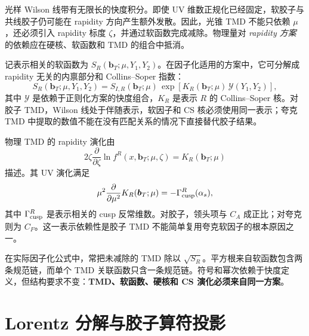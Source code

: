\documentclass[UTF8,12pt,a4paper,twoside,openany]{ctexbook}
\newcommand{\bT}{\boldsymbol b_T}
\begin{document}
光样 Wilson 线带有无限长的快度积分。即使 UV 维数正规化已经固定，软胶子与共线胶子仍可能在 rapidity 方向产生额外发散。因此，光锥 TMD 不能只依赖 \(\mu\)，还必须引入 rapidity 标度 \(\zeta\)，并通过软函数完成减除\cite{Collins2011,JiReview2021}。物理量对 \emph{rapidity 方案} 的依赖应在硬核、软函数和 TMD 的组合中抵消。

记表示相关的软函数为 \(S_R(\bT;\mu,Y_1,Y_2)\)。在因子化适用的方案中，它可分解成 rapidity 无关的内禀部分和 Collins--Soper 指数：
\begin{equation}
  S_R(\bT;\mu,Y_1,Y_2)
  =S_{I,R}(\bT;\mu)\,
  \exp\left[K_R(\bT;\mu)\,\mathcal Y(Y_1,Y_2)\right],
  \label{eq:softfactor}
\end{equation}
其中 \(\mathcal Y\) 是依赖于正则化方案的快度组合，\(K_R\) 是表示 \(R\) 的 Collins--Soper 核。对胶子 TMD，Wilson 线处于伴随表示，软因子和 CS 核必须使用同一表示；夸克 TMD 中提取的数值不能在没有匹配关系的情况下直接替代胶子结果。

物理 TMD 的 rapidity 演化由
\begin{equation}
  2\zeta\frac{\partial}{\partial\zeta}
  \ln f^{R}(x,\bT;\mu,\zeta)
  =K_R(\bT;\mu)
  \label{eq:CSequation}
\end{equation}
描述。其 UV 演化满足
\begin{equation}
  \mu^2\frac{\partial}{\partial\mu^2}K_R(\bT;\mu)
  =-\Gamma^{R}_{\rm cusp}(\alpha_s),
  \label{eq:csrge}
\end{equation}
其中 \(\Gamma^{R}_{\rm cusp}\) 是表示相关的 cusp 反常维数。对胶子，领头项与 \(C_A\) 成正比；对夸克则为 \(C_F\)。这一表示依赖性是胶子 TMD 不能简单复用夸克软因子的根本原因之一。

在实际因子化公式中，常把未减除的 TMD 除以 \(\sqrt{S_R}\)。平方根来自软函数包含两条规范链，而单个 TMD 关联函数只含一条规范链。符号和幂次依赖于快度定义，但结构要求不变：\textbf{TMD、软函数、硬核和 CS 演化必须来自同一方案}。

\section{Lorentz 分解与胶子算符投影}
\end{document}

